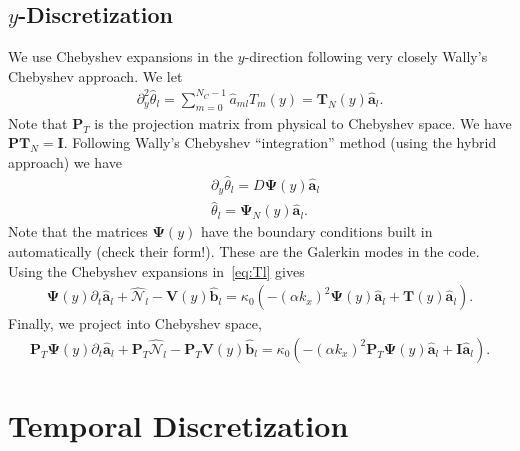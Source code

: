 \documentclass[12pt]{article}
\newcommand{\lr}[1]{\left(#1\right)}
\newcommand{\wh}[1]{\widehat{#1}}
\begin{document}
  \subsection{$y$-Discretization}
    We use Chebyshev expansions in the $y$-direction following very closely Wally's 
    Chebyshev approach.  We let 
    \begin{align}
      \partial_{y}^{2}\wh{\theta}_{l} = \sum_{m=0}^{N_{C}-1}{\wh{a}_{ml}T_{m}\lr{y}} = \mathbf{T}_{N}\lr{y}\wh{\mathbf{a}}_{l}.
    \end{align}
    Note that $\mathbf{P}_{T}$ is the projection matrix from physical to Chebyshev space.  
    We have $\mathbf{P}\mathbf{T}_{N} = \mathbf{I}$.  Following Wally's Chebyshev ``integration'' method 
    (using the hybrid approach) we have 
    \begin{align}
      &\partial_{y}\wh{\theta}_{l} = D\boldsymbol{\Psi}\lr{y}\wh{\mathbf{a}}_{l} \\
      &\wh{\theta}_{l} = \boldsymbol{\Psi}_{N}\lr{y}\wh{\mathbf{a}}_{l}.
    \end{align}
    Note that the matrices $\boldsymbol{\Psi}\lr{y}$ have the boundary conditions 
    built in automatically (check their form!).  These are the Galerkin modes in the 
    code.  Using the Chebyshev expansions in~\eqref{eq:Tl} gives 
    \begin{align}
      \boldsymbol{\Psi}\lr{y}\partial_{t}\wh{\mathbf{a}}_{l} + \wh{\mathcal{N}}_{l} - 
      \mathbf{V}\lr{y}\wh{\mathbf{b}}_{l} = 
      \kappa_{0}\lr{-\lr{\alpha k_{x}}^{2}\boldsymbol{\Psi}\lr{y}\wh{\mathbf{a}}_{l} + 
                    \mathbf{T}\lr{y}\wh{\mathbf{a}}_{l}}.
    \end{align}
    Finally, we project into Chebyshev space, 
    \begin{align}
      \mathbf{P}_{T}\boldsymbol{\Psi}\lr{y}\partial_{t}\wh{\mathbf{a}}_{l} + \mathbf{P}_{T}\wh{\mathcal{N}}_{l} - 
      \mathbf{P}_{T}\mathbf{V}\lr{y}\wh{\mathbf{b}}_{l} = 
      \kappa_{0}\lr{-\lr{\alpha k_{x}}^{2}\mathbf{P}_{T}\boldsymbol{\Psi}\lr{y}\wh{\mathbf{a}}_{l} + 
                    \mathbf{I}\wh{\mathbf{a}}_{l}}.
    \end{align}

  \section{Temporal Discretization}
\end{document}
